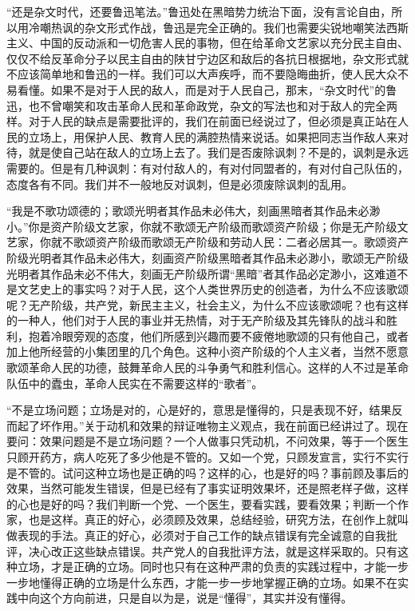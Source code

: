 “还是杂文时代，还要鲁迅笔法。”鲁迅处在黑暗势力统治下面，没有言论自由，所以用冷嘲热讽的杂文形式作战，鲁迅是完全正确的。我们也需要尖锐地嘲笑法西斯主义、中国的反动派和一切危害人民的事物，但在给革命文艺家以充分民主自由、仅仅不给反革命分子以民主自由的陕甘宁边区和敌后的各抗日根据地，杂文形式就不应该简单地和鲁迅的一样。我们可以大声疾呼，而不要隐晦曲折，使人民大众不易看懂。如果不是对于人民的敌人，而是对于人民自己，那末，“杂文时代”的鲁迅，也不曾嘲笑和攻击革命人民和革命政党，杂文的写法也和对于敌人的完全两样。对于人民的缺点是需要批评的，我们在前面已经说过了，但必须是真正站在人民的立场上，用保护人民、教育人民的满腔热情来说话。如果把同志当作敌人来对待，就是使自己站在敌人的立场上去了。我们是否废除讽刺？不是的，讽刺是永远需要的。但是有几种讽刺：有对付敌人的，有对付同盟者的，有对付自己队伍的，态度各有不同。我们并不一般地反对讽刺，但是必须废除讽刺的乱用。

“我是不歌功颂德的；歌颂光明者其作品未必伟大，刻画黑暗者其作品未必渺小。”你是资产阶级文艺家，你就不歌颂无产阶级而歌颂资产阶级；你是无产阶级文艺家，你就不歌颂资产阶级而歌颂无产阶级和劳动人民：二者必居其一。歌颂资产阶级光明者其作品未必伟大，刻画资产阶级黑暗者其作品未必渺小，歌颂无产阶级光明者其作品未必不伟大，刻画无产阶级所谓“黑暗”者其作品必定渺小，这难道不是文艺史上的事实吗？对于人民，这个人类世界历史的创造者，为什么不应该歌颂呢？无产阶级，共产党，新民主主义，社会主义，为什么不应该歌颂呢？也有这样的一种人，他们对于人民的事业并无热情，对于无产阶级及其先锋队的战斗和胜利，抱着冷眼旁观的态度，他们所感到兴趣而要不疲倦地歌颂的只有他自己，或者加上他所经营的小集团里的几个角色。这种小资产阶级的个人主义者，当然不愿意歌颂革命人民的功德，鼓舞革命人民的斗争勇气和胜利信心。这样的人不过是革命队伍中的蠹虫，革命人民实在不需要这样的“歌者”。

“不是立场问题；立场是对的，心是好的，意思是懂得的，只是表现不好，结果反而起了坏作用。”关于动机和效果的辩证唯物主义观点，我在前面已经讲过了。现在要问：效果问题是不是立场问题？一个人做事只凭动机，不问效果，等于一个医生只顾开药方，病人吃死了多少他是不管的。又如一个党，只顾发宣言，实行不实行是不管的。试问这种立场也是正确的吗？这样的心，也是好的吗？事前顾及事后的效果，当然可能发生错误，但是已经有了事实证明效果坏，还是照老样子做，这样的心也是好的吗？我们判断一个党、一个医生，要看实践，要看效果；判断一个作家，也是这样。真正的好心，必须顾及效果，总结经验，研究方法，在创作上就叫做表现的手法。真正的好心，必须对于自己工作的缺点错误有完全诚意的自我批评，决心改正这些缺点错误。共产党人的自我批评方法，就是这样采取的。只有这种立场，才是正确的立场。同时也只有在这种严肃的负责的实践过程中，才能一步一步地懂得正确的立场是什么东西，才能一步一步地掌握正确的立场。如果不在实践中向这个方向前进，只是自以为是，说是“懂得”，其实并没有懂得。

